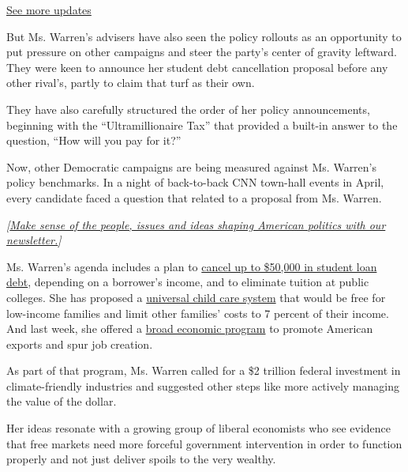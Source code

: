 \href{https://www.nytimes3xbfgragh.onion/2020/07/31/us/elections/biden-vs-trump.html?action=click\&pgtype=Article\&state=default\&region=MAIN_CONTENT_1\&context=storylines_live_updates}{See
more updates}

But Ms. Warren's advisers have also seen the policy rollouts as an
opportunity to put pressure on other campaigns and steer the party's
center of gravity leftward. They were keen to announce her student debt
cancellation proposal before any other rival's, partly to claim that
turf as their own.

They have also carefully structured the order of her policy
announcements, beginning with the ``Ultramillionaire Tax'' that provided
a built-in answer to the question, ``How will you pay for it?''

Now, other Democratic campaigns are being measured against Ms. Warren's
policy benchmarks. In a night of back-to-back CNN town-hall events in
April, every candidate faced a question that related to a proposal from
Ms. Warren.

\emph{{[}}\href{https://www.nytimes3xbfgragh.onion/newsletters/politics?smid=rd?action=click\&module=Intentional\&pgtype=Article}{\emph{Make
sense of the people, issues and ideas shaping American politics with our
newsletter.}}\emph{{]}}

Ms. Warren's agenda includes a plan to
\href{https://www.nytimes3xbfgragh.onion/2019/04/22/us/politics/elizabeth-warren-student-debt.html}{cancel
up to \$50,000 in student loan debt}, depending on a borrower's income,
and to eliminate tuition at public colleges. She has proposed a
\href{https://www.nytimes3xbfgragh.onion/2019/02/19/us/politics/elizabeth-warren-child-care.html}{universal
child care system} that would be free for low-income families and limit
other families' costs to 7 percent of their income. And last week, she
offered a
\href{https://www.nytimes3xbfgragh.onion/2019/06/04/us/politics/elizabeth-warren-economy-jobs.html}{broad
economic program} to promote American exports and spur job creation.

As part of that program, Ms. Warren called for a \$2 trillion federal
investment in climate-friendly industries and suggested other steps like
more actively managing the value of the dollar.

Her ideas resonate with a growing group of liberal economists who see
evidence that free markets need more forceful government intervention in
order to function properly and not just deliver spoils to the very
wealthy.

